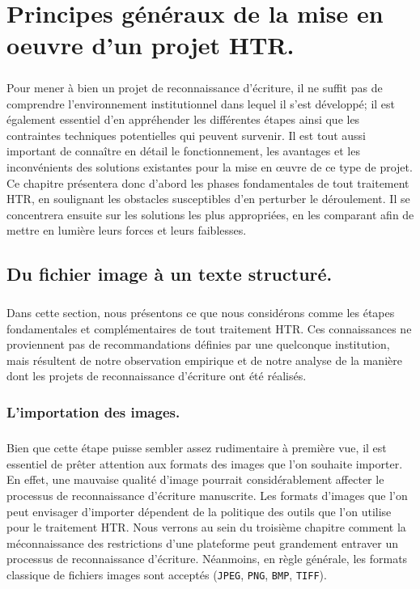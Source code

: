 \documentclass[a4paper,12pt,twoside]{book}
\begin{document}
\chapter{Principes généraux de la mise en oeuvre d'un projet HTR. }

\paragraph{}
Pour mener à bien un projet de reconnaissance d'écriture, il ne suffit pas de comprendre l'environnement institutionnel dans lequel il s'est développé; il est également essentiel d'en appréhender les différentes étapes ainsi que les contraintes techniques potentielles qui peuvent survenir. Il est tout aussi important de connaître en détail le fonctionnement, les avantages et les inconvénients des solutions existantes pour la mise en œuvre de ce type de projet. Ce chapitre présentera donc d'abord les phases fondamentales de tout traitement HTR, en soulignant les obstacles susceptibles d'en perturber le déroulement. Il se concentrera ensuite sur les solutions les plus appropriées, en les comparant afin de mettre en lumière leurs forces et leurs faiblesses.

\section{Du fichier image à un texte structuré.}
	
\paragraph{}
Dans cette section, nous présentons ce que nous considérons comme les étapes fondamentales et complémentaires de tout traitement HTR. Ces connaissances ne proviennent pas de recommandations définies par une quelconque institution, mais résultent de notre observation empirique et de notre analyse de la manière dont les projets de reconnaissance d'écriture ont été réalisés.

\subsection{L'importation des images.}
\paragraph{}
Bien que cette étape puisse sembler assez rudimentaire à première vue, il est essentiel de prêter attention aux formats des images que l'on souhaite importer. En effet, une mauvaise qualité d'image pourrait considérablement affecter le processus de reconnaissance d'écriture manuscrite. Les formats d'images que l'on peut envisager d'importer dépendent de la politique des outils que l'on utilise pour le traitement HTR. Nous verrons au sein du troisième chapitre comment la méconnaissance des restrictions d'une plateforme peut grandement entraver un processus de reconnaissance d'écriture. Néanmoins, en règle générale, les formats classique de fichiers images sont acceptés (\texttt{JPEG}, \texttt{PNG}, \texttt{BMP}, \texttt{TIFF}). 
\end{document}
